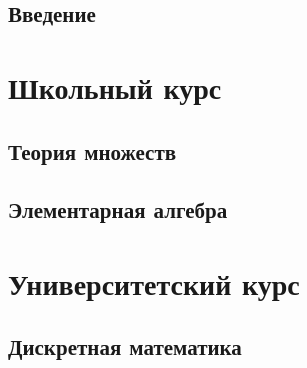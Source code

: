\documentclass{report}
\begin{document}
\chapter*{Введение}

\tableofcontents
\part{Школьный курс}
\chapter{Теория множеств}

	
	
	
\chapter{Элементарная алгебра}

	
	
	


\part{Университетский курс}
\chapter{Дискретная математика}

	
	
	
	
	
	
	
\end{document}
